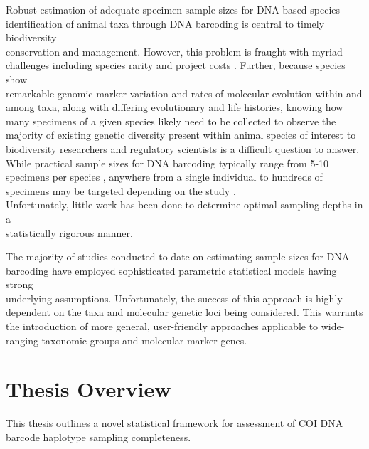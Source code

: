 \vspace{5mm}

Robust estimation of adequate specimen sample sizes for DNA-based species \\ identification of animal taxa through DNA barcoding is central to timely biodiversity \\ conservation and management. However, this problem is fraught with myriad challenges including species rarity and project costs \cite{cameron2006will, stein2014is}. Further, because species show \\ remarkable genomic marker variation and rates of molecular evolution within and among taxa, along with differing evolutionary and life histories, knowing how many specimens of a given species likely need to be collected to observe the majority of existing genetic diversity present within animal species of interest to biodiversity researchers and regulatory scientists is a difficult question to answer. While practical sample sizes for DNA barcoding typically range from 5-10 specimens per species \cite{zhang2010estimating}, anywhere from a single individual to hundreds of specimens may be targeted depending on the study \cite{hajibabaei2007dna, matz2005likelihood, zhang2010estimating}. \\ Unfortunately, little work has been done to determine optimal sampling depths in a \\ statistically rigorous manner. 

\vspace{5mm}

The majority of studies conducted to date on estimating sample sizes for DNA \\ barcoding have employed sophisticated parametric statistical models having strong \\ underlying assumptions. Unfortunately, the success of this approach is highly dependent on the taxa and molecular genetic loci being considered. This warrants the introduction of more general, user-friendly approaches applicable to wide-ranging taxonomic groups and molecular marker genes. 

\vspace{5mm}

\section{Thesis Overview} \label{sec:intro1}

This thesis outlines a novel statistical framework for assessment of COI DNA barcode haplotype sampling completeness. 

